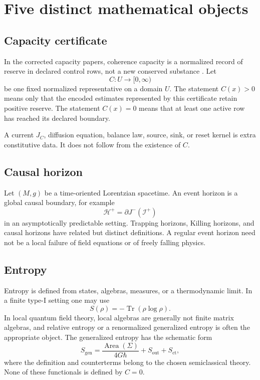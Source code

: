 \documentclass[11pt,a4paper]{article}
\numberwithin{equation}{section}
\theoremstyle{definition}
\theoremstyle{remark}
\newcommand{\cH}{\mathcal H}
\begin{document}
\section{Five distinct mathematical objects}
\label{sec:types}

\subsection{Capacity certificate}

In the corrected capacity papers, coherence capacity is a normalized
record of reserve in declared control rows, not a new conserved substance
\cite{NeroCapacity,NeroDynamics}.  Let
\[
  C:U\longrightarrow [0,\infty)
\]
be one fixed normalized representative on a domain \(U\).  The statement
\(C(x)>0\) means only that the encoded estimates represented by this
certificate retain positive reserve.  The statement \(C(x)=0\) means that
at least one active row has reached its declared boundary.

A current \(J_C\), diffusion equation, balance law, source, sink, or reset
kernel is extra constitutive data.  It does not follow from the existence
of \(C\).

\subsection{Causal horizon}

Let \((M,g)\) be a time-oriented Lorentzian spacetime.  An event horizon is
a global causal boundary, for example
\[
  \cH^+=\partial J^-(\mathcal I^+)
\]
in an asymptotically predictable setting.  Trapping horizons, Killing
horizons, and causal horizons have related but distinct definitions.  A
regular event horizon need not be a local failure of field equations or
of freely falling physics.

\subsection{Entropy}

Entropy is defined from states, algebras, measures, or a thermodynamic
limit.  In a finite type-I setting one may use
\[
  S(\rho)=-\operatorname{Tr}(\rho\log\rho).
\]
In local quantum field theory, local algebras are generally not finite
matrix algebras, and relative entropy or a renormalized generalized
entropy is often the appropriate object.  The generalized entropy has
the schematic form
\[
  S_{\mathrm{gen}}
  =
  \frac{\operatorname{Area}(\Sigma)}{4G\hbar}
  +S_{\mathrm{out}}
  +S_{\mathrm{ct}},
\]
where the definition and counterterms belong to the chosen
semiclassical theory.  None of these functionals is defined by \(C=0\).
\end{document}
